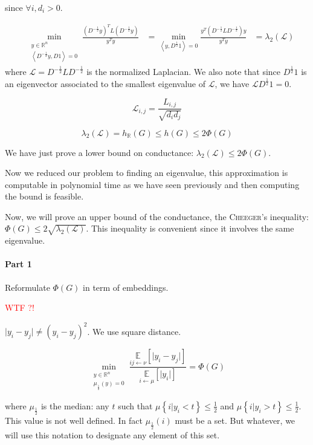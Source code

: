 \documentclass[12pt]{article}
\newcommand{\EE}{\mathbb{E}}
\newcommand{\RR}{\mathbb{R}}
\renewcommand{\L}{\mathcal{L}}
\newcommand{\set}[1]{\left\{ #1 \right\}}
\renewcommand{\angle}[1]{\left\langle #1 \right\rangle}
\newcommand{\wtf}[1]{\Huge\textcolor{red}{WTF ?! #1}\normalsize}
\newcommand{\la}{\leftarrow}
\newcommand{\esp}[2][]{\underset{#1}{\EE}\left[ #2 \right]}
\begin{document}
since $\forall i, d_i >0$.

\[
    \begin{aligned}
        &\min\limits_{\substack{y\in\RR^n\\\angle{D^{- \frac{1}{2}}y,D1}=0}} \frac{(D^{-\frac{1}{2}} y)^T L (D^{-\frac{1}{2}}y)}{y^Ty} &= \min\limits_{\angle{y, D^{\frac{1}{2}}1}=0} \frac{y^T(D^{-\frac{1}{2}}LD^{-\frac{1}{2}})y}{y^T y}
        &= \lambda_2 (\L)
    \end{aligned}
\]
where $\L = D^{-\frac{1}{2}} L D^{-\frac{1}{2}}$ is the normalized Laplacian. We also note that since $D^{\frac{1}{2}}1$ is an eigenvector associated to the smallest eigenvalue of $\L$, we have $\L D^{\frac{1}{2}} 1 =0$.

\[
    \boxed{\L_{i,j} = \frac{L_{i,j}}{\sqrt{d_id_j}}}
\]

\[
    \lambda_2(\L) = h_\RR(G) \leqslant h(G) \leqslant 2\Phi(G)
\]

We have just prove a lower bound on conductance: $\lambda_2(\L) \leqslant 2\Phi(G)$. 

Now we reduced our problem to finding an eigenvalue, this approximation is computable in polynomial time as we have seen previously and then computing the bound is feasible.

Now, we will prove an upper bound of the conductance, the \textsc{Cheeger}'s inequality: $\Phi(G) \leqslant 2\sqrt{\lambda_2(\L)}$. This inequality is convenient since it involves the same eigenvalue.

\paragraph{Part 1}

Reformulate $\Phi(G)$ in term of embeddings.

\wtf{}

$\lvert y_i -y_j \rvert \neq (y_i-y_j)^2$. We use square distance.

\[
    \min\limits_{\substack{y\in\RR^n\\\mu_{\frac{1}{2}}(y)=0}} \frac{\esp[ij\la\nu]{\lvert y_i-y_j\rvert}}{\esp[i\la\mu]{\lvert y_i \rvert}} = \Phi(G)
\]


where $\mu_{\frac{1}{2}}$ is the median: any $t$ such that $\mu\set{i\vert y_i < t} \leqslant \frac{1}{2}$ and $\mu\set{i\vert y_i >t} \leqslant \frac{1}{2}$. This value is not well defined. In fact $\mu_{\frac{1}{2}}(i)$ must be a set. But whatever, we will use this notation to designate any element of this set.
\end{document}
